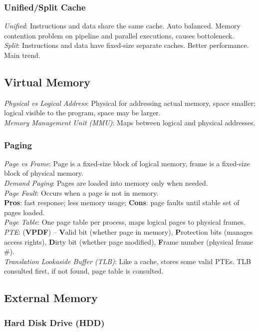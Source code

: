 \subsubsection*{Unified/Split Cache}
\emph{Unified}: Instructions and data share the same cache. Auto balanced. Memory contention problem on pipeline and parallel executions, causes bottoleneck.\\
\emph{Split}: Instructions and data have fixed-size separate caches. Better performance. Main trend.

\subsection*{Virtual Memory}
\emph{Physical vs Logical Address}: Physical for addressing actual memory, space smaller; logical visible to the program, space may be larger.\\
\emph{Memory Management Unit (MMU)}: Maps between logical and physical addresses.

\subsubsection*{Paging}
\emph{Page vs Frame}: Page is a fixed-size block of logical memory, frame is a fixed-size block of physical memory.\\
\emph{Demand Paging}: Pages are loaded into memory only when needed.\\
\emph{Page Fault}: Occurs when a page is not in memory.\\
\textbf{Pros}: fast response; less memory usage;
\textbf{Cons}: page faults until stable set of pages loaded.\\
\emph{Page Table}: One page table per process, maps logical pages to physical frames.\\
\emph{PTE}: (\textbf{VPDF}) --
\textbf{V}alid bit (whether page in memory),
\textbf{P}rotection bits (manages access rights),
\textbf{D}irty bit (whether page modified),
\textbf{F}rame number (physical frame \#).\\
\emph{Translation Lookaside Buffer (TLB)}: Like a cache, stores some valid PTEs.
TLB consulted first, if not found, page table is consulted.\\

\subsection*{External Memory}

\subsubsection*{Hard Disk Drive (HDD)}

